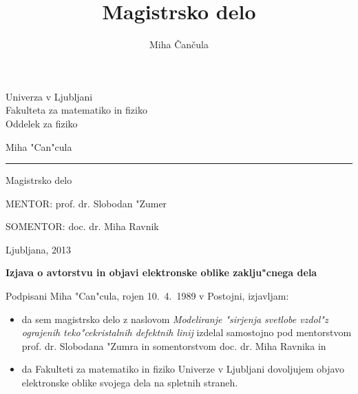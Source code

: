 \documentclass[12pt,twoside,openright,final,a4paper]{report}
\title{Magistrsko delo}
\author{Miha \v Can\v cula}
\begin{document}
\thispagestyle{empty}
\begin{center}
{\Large\sc Univerza v Ljubljani \\
\medskip
Fakulteta za matematiko in fiziko\\
\medskip
Oddelek za fiziko}\\

\vfill

\bigskip\bigskip\bigskip\bigskip\bigskip\bigskip\bigskip\bigskip
\bigskip\bigskip\bigskip

{\Large Miha "Can"cula}\\

\bigskip\bigskip\bigskip

{\LARGE{}}

\bigskip

{\LARGE{}}

\vskip 8mm \hrule height0.5mm \vskip 12mm


{\Large Magistrsko delo}\\

\bigskip\bigskip\bigskip\bigskip\bigskip\bigskip\bigskip\bigskip\bigskip\bigskip\bigskip\bigskip\bigskip\bigskip\bigskip

{\Large MENTOR: prof. dr. Slobodan "Zumer}\\ \smallskip\smallskip\smallskip

{\Large SOMENTOR: doc. dr. Miha Ravnik}

\bigskip\bigskip

\vfill
{\Large Ljubljana, 2013}
\end{center}

\newpage

\thispagestyle{empty}
\quad

\newpage

\thispagestyle{empty}

\centerline{}

\vfill

\centerline{\bf Izjava o avtorstvu in objavi elektronske oblike zaklju"cnega dela}
\bigskip\bigskip
\noindent


Podpisani Miha "Can"cula, rojen 10.~4.~1989 v Postojni, izjavljam:

\begin{itemize}
 \item da sem magistrsko delo z naslovom \emph{Modeliranje "sirjenja svetlobe vzdol"z ograjenih teko"cekristalnih defektnih linij} izdelal samostojno pod mentorstvom prof. dr. Slobodana "Zumra in somentorstvom doc. dr. Miha Ravnika in
 \item da Fakulteti za matematiko in fiziko Univerze v Ljubljani dovoljujem objavo \\ elektronske oblike svojega dela na spletnih straneh. 
\end{itemize}
 
\end{document}
